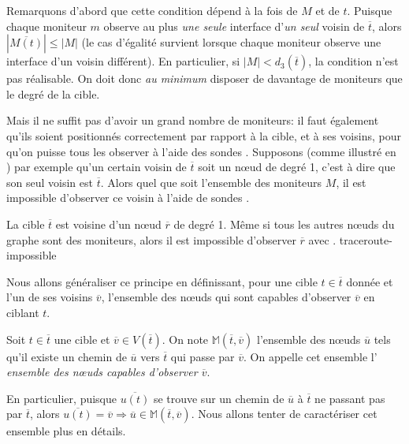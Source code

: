 Remarquons d'abord que cette condition dépend à la fois de $M$ et de $t$.
Puisque chaque moniteur $m$ observe au plus {\em une seule} interface d'{\em un
seul} voisin de $\overline{t}$, alors $|\overline{M(t)}| \leq |M|$ (le cas
d'égalité survient lorsque chaque moniteur observe une interface d'un voisin
différent). En particulier, si $|M| < d_3(\overline{t})$, la condition n'est pas
réalisable. On doit donc {\em au minimum} disposer de davantage de moniteurs que
le degré de la cible.

Mais il ne suffit pas d'avoir un grand nombre de moniteurs: il faut également
qu'ils soient positionnés correctement par rapport à la cible, et à ses voisins,
pour qu'on puisse tous les observer à l'aide des sondes \traceroute. Supposons
(comme illustré en ) par exemple qu'un certain
voisin de $\overline{t}$ soit un n\oe{}ud de degré 1, c'est à dire que son seul
voisin est $\overline{t}$. Alors quel que soit l'ensemble des moniteurs $M$, il
est impossible d'observer ce voisin à l'aide de sondes \traceroute.

 {La cible $\overline{t}$ est voisine d'un n\oe{}ud $\overline{r}$ de
degré 1. Même si tous les autres n\oe{}uds du graphe sont des moniteurs, alors il
est impossible d'observer $\overline{r}$ avec \traceroute.}
{traceroute-impossible}

Nous allons généraliser ce principe en définissant, pour une cible $t \in
\overline{t}$ donnée et l'un de ses voisins $\overline{v}$, l'ensemble des
n\oe{}uds qui sont capables d'observer $\overline{v}$ en ciblant $t$.

\begin{definition} Soit
$t \in \overline{t}$ une cible et $\overline{v} \in V(\overline{t})$. On note
$\mathbb{M}(\overline{t}, \overline{v})$ l'ensemble des n\oe{}uds $\overline{u}$
tels qu'il existe un chemin de $\overline{u}$ vers $\overline{t}$ qui passe par
$\overline{v}$. On appelle cet ensemble l'{\em
ensemble des n\oe{}uds capables d'observer $\overline{v}$}.
\end{definition}

En particulier, puisque $\overline{u(t)}$ se trouve sur un chemin de
$\overline{u}$ à $\overline{t}$ ne passant pas par $\overline{t}$, alors
$\overline{u(t)} = \overline{v} \Rightarrow \overline{u} \in
\mathbb{M}(\overline{t}, \overline{v})$. Nous allons tenter de caractériser cet
ensemble plus en détails.


